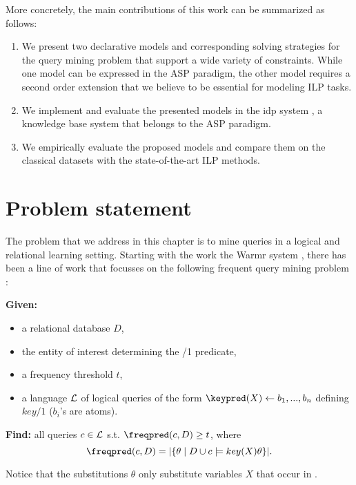 More concretely, the main contributions of this work can be summarized as follows:
\begin{enumerate}
  \item We present two declarative models and corresponding solving strategies for the query mining problem that support a wide variety of constraints.  While one model can be expressed in the ASP paradigm, the other model requires a  second order extension that we believe
to be essential for modeling ILP tasks. 
  \item We implement and evaluate the presented models in the \acrshort{idp} system \parencite{idp}, a knowledge base system that belongs to the ASP paradigm.
  \item We empirically evaluate the proposed models and compare them on the classical datasets with the state-of-the-art ILP methods.
\end{enumerate}

\section{Problem statement}\label{sec:problem}

The problem that we address in this chapter is to mine queries in a logical and relational learning setting. Starting with the work the Warmr system \parencite{warmr}, there has been a line of work that focusses on the following frequent query mining problem \parencite{bagm,farmer,condensed_luc}:


\noindent
{\bf Given:} \vspace{-8pt}
\begin{itemize}
\item a relational database $D$,
\item the entity of interest determining the \keypred/1 predicate,
\item a frequency threshold $t$,
\item a language ${\cal L}$ of logical queries of the form $\keypred(X) \leftarrow b_1, ..., b_n$ defining $key/1$ ($b_i$'s are atoms).
\end{itemize}\vspace{-5pt}
{\bf Find:} all queries $c \in {\cal L}$ s.t. $\freqpred(c,D) \geq t$, where 
\begin{equation*}
\freqpred(c,D) = |\{\theta \mid D \cup c \models key(X)\theta \}|.
\end{equation*}

Notice that the substitutions $\theta$ only substitute variables $X$ that occur in \keypred. 

